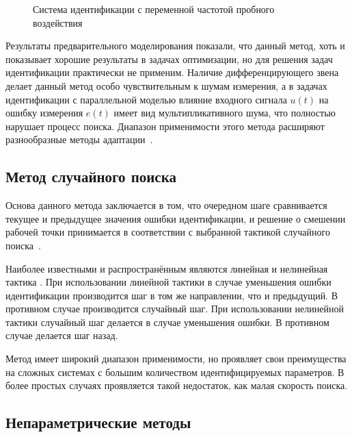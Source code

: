 \begin{figure}[htb!]
\begin{center}

\end{center}
\caption{Система идентификации с переменной частотой пробного воздействия}
\label{atu:f:varfreq}
\end{figure}


Результаты предварительного моделирования показали,
что данный метод, хоть и показывает хорошие результаты
в задачах оптимизации, но для решения задач идентификации
практически не применим. Наличие дифференцирующего
звена делает данный метод особо чувствительным к шумам
измерения, а в задачах идентификации с параллельной моделью
влияние входного сигнала \( u(t) \)
на ошибку измерения \( e(t) \)
имеет вид мультипликативного шума,
что полностью нарушает процесс поиска.
Диапазон применимости этого метода расширяют разнообразные методы
адаптации~\cite{auto_optim_intask}.


\subsection{Метод случайного поиска} %

Основа данного метода заключается в том, что
очередном шаге сравнивается текущее и предыдущее
значения ошибки идентификации, и решение о смешении
рабочей точки принимается в соответствии с выбранной
тактикой случайного поиска~\cite{rastr_rand_search,rastr_rand_search_adopt,ivanov_stoh_alg_int}.

Наиболее известными и распространённым
являются линейная и нелинейная тактика
\cite{rastr_rand_search,gladkov_optim_nongrad}.
При использовании линейной тактики
в случае уменьшения ошибки идентификации
производится шаг в том же направлении, что и предыдущий.
В противном случае производится случайный шаг.
При использовании нелинейной тактики
случайный шаг делается в случае уменьшения ошибки.
В противном случае делается шаг назад.

Метод имеет широкий диапазон применимости,
но проявляет свои преимущества на сложных
системах с большим количеством идентифицируемых параметров.
В более простых случаях проявляется такой недостаток,
как малая скорость поиска.


\subsection{Непараметрические методы} %

